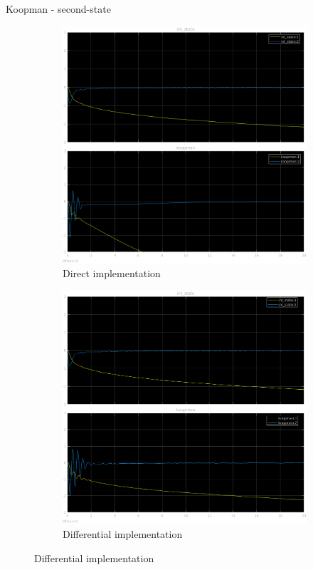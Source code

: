 \documentclass{beamer}
\begin{document}
\begin{frame}{Koopman - second-state}
    \begin{figure}
        \centering
        \begin{subfigure}[b]{0.45\textwidth}
            \centering
            \includegraphics[width=\textwidth]{second_koopman_direct.png}
            \caption{Direct implementation}
        \end{subfigure}
        \hfill
        \begin{subfigure}[b]{0.45\textwidth}
            \centering
            \includegraphics[width=\textwidth]{second_koopman_differential.png}
            \caption{Differential implementation}
        \end{subfigure}
    \end{figure}
\end{frame}
\end{document}
